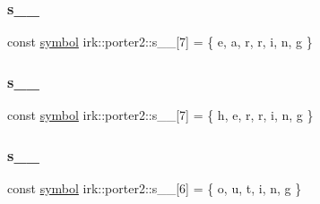\mbox{\label{namespaceirk_1_1porter2_a73ade7498df6545e2daf9c47db1296f9}} 
\subsubsection{\texorpdfstring{s\+\_\+\_}{s\_9\_5}}
{\footnotesize\ttfamily const \mbox{\hyperlink{namespaceirk_1_1porter2_afd04c4eb58a1dabcf8f3ab2d7e9f9ed5}{symbol}} irk\+::porter2\+::s\+\_\+\_\mbox{[}7\mbox{]} = \{ \textquotesingle{}e\textquotesingle{}, \textquotesingle{}a\textquotesingle{}, \textquotesingle{}r\textquotesingle{}, \textquotesingle{}r\textquotesingle{}, \textquotesingle{}i\textquotesingle{}, \textquotesingle{}n\textquotesingle{}, \textquotesingle{}g\textquotesingle{} \}\hspace{0.3cm}{\ttfamily [static]}}

\mbox{\label{namespaceirk_1_1porter2_af55018b3afb6e3a4668093586de6d0a1}} 
\subsubsection{\texorpdfstring{s\+\_\+\_}{s\_9\_6}}
{\footnotesize\ttfamily const \mbox{\hyperlink{namespaceirk_1_1porter2_afd04c4eb58a1dabcf8f3ab2d7e9f9ed5}{symbol}} irk\+::porter2\+::s\+\_\+\_\mbox{[}7\mbox{]} = \{ \textquotesingle{}h\textquotesingle{}, \textquotesingle{}e\textquotesingle{}, \textquotesingle{}r\textquotesingle{}, \textquotesingle{}r\textquotesingle{}, \textquotesingle{}i\textquotesingle{}, \textquotesingle{}n\textquotesingle{}, \textquotesingle{}g\textquotesingle{} \}\hspace{0.3cm}{\ttfamily [static]}}

\mbox{\label{namespaceirk_1_1porter2_af668a90d0e607e7705fe3de2e851f298}} 
\subsubsection{\texorpdfstring{s\+\_\+\_}{s\_9\_7}}
{\footnotesize\ttfamily const \mbox{\hyperlink{namespaceirk_1_1porter2_afd04c4eb58a1dabcf8f3ab2d7e9f9ed5}{symbol}} irk\+::porter2\+::s\+\_\+\_\mbox{[}6\mbox{]} = \{ \textquotesingle{}o\textquotesingle{}, \textquotesingle{}u\textquotesingle{}, \textquotesingle{}t\textquotesingle{}, \textquotesingle{}i\textquotesingle{}, \textquotesingle{}n\textquotesingle{}, \textquotesingle{}g\textquotesingle{} \}\hspace{0.3cm}{\ttfamily [static]}}

